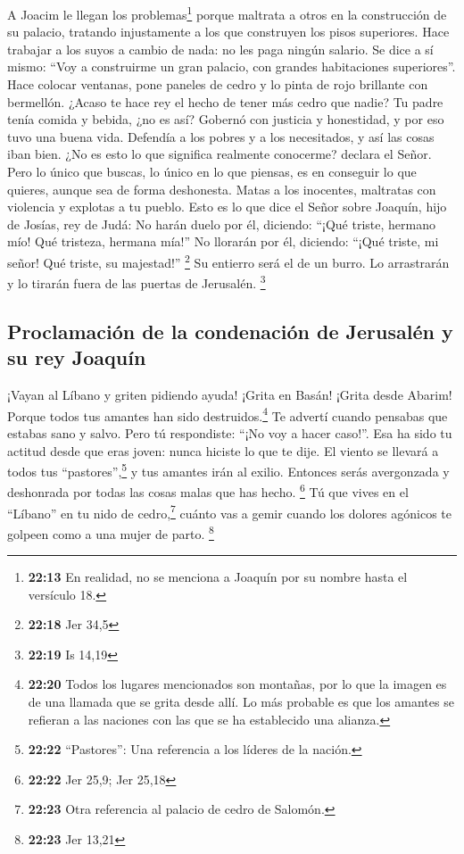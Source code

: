  A Joacim le llegan los problemas\footnote{\textbf{22:13}
  En realidad, no se menciona a Joaquín por su nombre hasta el versículo
  18.} porque maltrata a otros en la construcción de su palacio,
tratando injustamente a los que construyen los pisos superiores. Hace
trabajar a los suyos a cambio de nada: no les paga ningún salario.
 Se dice a sí mismo: ``Voy a construirme un gran palacio,
con grandes habitaciones superiores''. Hace colocar ventanas, pone
paneles de cedro y lo pinta de rojo brillante con bermellón.
 ¿Acaso te hace rey el hecho de tener más cedro que
nadie? Tu padre tenía comida y bebida, ¿no es así? Gobernó con justicia
y honestidad, y por eso tuvo una buena vida.  Defendía a
los pobres y a los necesitados, y así las cosas iban bien. ¿No es esto
lo que significa realmente conocerme? declara el Señor. 
Pero lo único que buscas, lo único en lo que piensas, es en conseguir lo
que quieres, aunque sea de forma deshonesta. Matas a los inocentes,
maltratas con violencia y explotas a tu pueblo.  Esto es
lo que dice el Señor sobre Joaquín, hijo de Josías, rey de Judá: No
harán duelo por él, diciendo: ``¡Qué triste, hermano mío! Qué tristeza,
hermana mía!'' No llorarán por él, diciendo: ``¡Qué triste, mi señor!
Qué triste, su majestad!'' \footnote{\textbf{22:18} Jer 34,5}
 Su entierro será el de un burro. Lo arrastrarán y lo
tirarán fuera de las puertas de Jerusalén. \footnote{\textbf{22:19} Is
  14,19}

\hypertarget{proclamaciuxf3n-de-la-condenaciuxf3n-de-jerusaluxe9n-y-su-rey-joaquuxedn}{%
\subsection{Proclamación de la condenación de Jerusalén y su rey
Joaquín}\label{proclamaciuxf3n-de-la-condenaciuxf3n-de-jerusaluxe9n-y-su-rey-joaquuxedn}}

 ¡Vayan al Líbano y griten pidiendo ayuda! ¡Grita en
Basán! ¡Grita desde Abarim! Porque todos tus amantes han sido
destruidos.\footnote{\textbf{22:20} Todos los lugares mencionados son
  montañas, por lo que la imagen es de una llamada que se grita desde
  allí. Lo más probable es que los amantes se refieran a las naciones
  con las que se ha establecido una alianza.}  Te advertí
cuando pensabas que estabas sano y salvo. Pero tú respondiste: ``¡No voy
a hacer caso!''. Esa ha sido tu actitud desde que eras joven: nunca
hiciste lo que te dije.  El viento se llevará a todos tus
``pastores'',\footnote{\textbf{22:22} ``Pastores'': Una referencia a los
  líderes de la nación.} y tus amantes irán al exilio. Entonces serás
avergonzada y deshonrada por todas las cosas malas que has hecho.
\footnote{\textbf{22:22} Jer 25,9; Jer 25,18}  Tú que
vives en el ``Líbano'' en tu nido de cedro,\footnote{\textbf{22:23} Otra
  referencia al palacio de cedro de Salomón.} cuánto vas a gemir cuando
los dolores agónicos te golpeen como a una mujer de parto. \footnote{\textbf{22:23}
  Jer 13,21}

